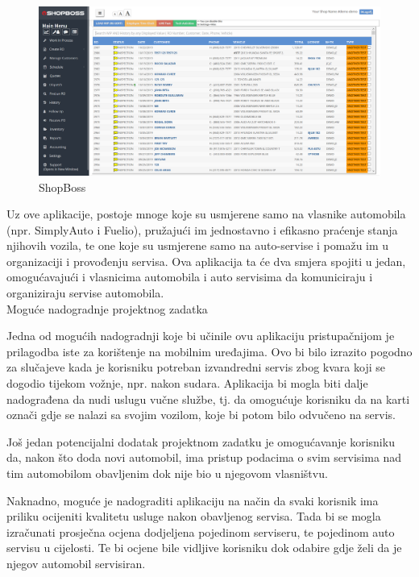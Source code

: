		\begin{figure}[H]
			\includegraphics[scale=0.3]{slike/shopboss.PNG}
			\centering
			\caption{ShopBoss}
			\label{fig:shopboss}
		\end{figure}
		
		Uz ove aplikacije, postoje mnoge koje su usmjerene samo na vlasnike automobila (npr. SimplyAuto i Fuelio), pružajući im jednostavno i efikasno praćenje stanja njihovih vozila, te one koje su usmjerene samo na auto-servise i pomažu im u organizaciji i provođenju servisa. Ova aplikacija ta će dva smjera spojiti u jedan, omogućavajući i vlasnicima automobila i auto servisima da komuniciraju i organiziraju servise automobila. \\
		
			\Large Moguće nadogradnje projektnog zadatka
		
		\normalsize Jedna od mogućih nadogradnji koje bi učinile ovu aplikaciju pristupačnijom je prilagodba iste za korištenje na mobilnim uređajima. Ovo bi bilo izrazito pogodno za slučajeve kada je korisniku potreban izvandredni servis zbog kvara koji se dogodio tijekom vožnje, npr. nakon sudara. Aplikacija bi mogla biti dalje nadograđena da nudi uslugu vučne službe, tj. da omogućuje korisniku da na karti označi gdje se nalazi sa svojim vozilom, koje bi potom bilo odvučeno na servis.
		
		Još jedan potencijalni dodatak projektnom zadatku je omogućavanje korisniku da, nakon što doda novi automobil, ima pristup podacima o svim servisima nad tim automobilom obavljenim dok nije bio u njegovom vlasništvu.
		
		Naknadno, moguće je nadograditi aplikaciju na način da svaki korisnik ima priliku ocijeniti kvalitetu usluge nakon obavljenog servisa. Tada bi se mogla izračunati prosječna ocjena dodjeljena pojedinom serviseru, te pojedinom auto servisu u cijelosti. Te bi ocjene bile vidljive korisniku dok odabire gdje želi da je njegov automobil servisiran.
		
